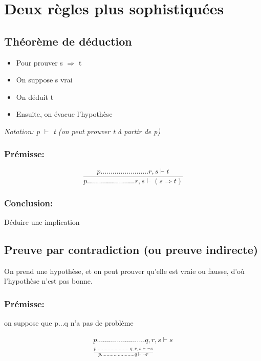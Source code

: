\section{Deux règles plus sophistiquées}
\subsection{Théorème de déduction}

\begin{itemize}
\item  Pour prouver s $\Rightarrow$ t
\item  On suppose s vrai
\item  On déduit t
\item  Ensuite, on évacue l'hypothèse
\end{itemize}


\textit{Notation: p $\vdash$ t (on peut prouver t à partir de p) }

\subsubsection{Prémisse:}

\begin{equation}
\frac{p........................r, s \vdash t} 
{p........................r, s \vdash (s \Rightarrow t)}
\end{equation}

\subsubsection{Conclusion:}

Déduire une implication

\subsection{Preuve par contradiction (ou preuve indirecte)}

On prend une hypothèse, et on peut prouver qu'elle est vraie ou fausse, d'où l'hypothèse n'est pas bonne.

\subsubsection{Prémisse:} 
on suppose que p...q n'a pas de problème

\begin{equation}
\begin{split}
p........................q, r, s \vdash s \\
\frac{p........................ q,r, s \vdash \lnot s}
{p........................ q \vdash \lnot r}
\end{split}
\end{equation}

